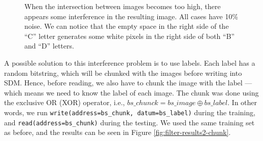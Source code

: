 \begin{figure}[!htb]
  \captionsetup[subfigure]{labelformat=empty}




  \caption{When the intersection between images becomes too high, there appears some interference in the resulting image. All cases have 10\% noise. We can notice that the empty space in the right side of the ``C'' letter generates some white pixels in the right side of both ``B'' and ``D'' letters.
  \label{fig:filter-results2}
  }
\end{figure}

A possible solution to this interference problem is to use labels. Each label has a random bitstring, which will be chunked with the images before writing into SDM. Hence, before reading, we also have to chunk the image with the label --- which means we need to know the label of each image. The chunk was done using the exclusive OR (XOR) operator, i.e., $bs\_chunck = bs\_image \oplus bs\_label$. In other words, we run \lstinline{write(address=bs_chunk, datum=bs_label)} during the training, and \lstinline{read(address=bs_chunk)} during the testing. We used the same training set as before, and the results can be seen in Figure \ref{fig:filter-results2-chunk}.

